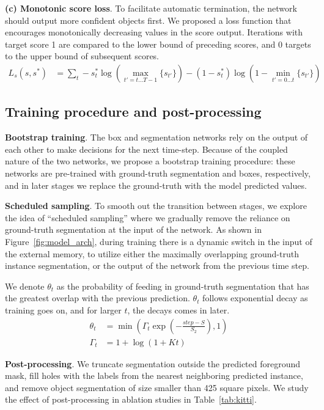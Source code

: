 \textbf{(c) Monotonic score loss}. To facilitate automatic termination, the
network should output more confident objects first. We proposed a loss function
that encourages monotonically decreasing values in the score output. Iterations
with target score 1 are compared to the lower bound of preceding scores, and 0
targets to the upper bound of subsequent scores.
\vspace{-3pt}
\begin{align}
L_s(s, s^*) &= \sum_t -s^*_t 
\log\left(\max_{t'=t...T-1} \{s_{t'}\}\right) - (1 - s^*_t)
\log\left(1 - \min_{t'=0...t} \{s_{t'}\}\right)
\end{align}

\subsection{Training procedure and post-processing}
\vspace{-3pt}

\textbf{Bootstrap training}. The box and segmentation networks rely on the
output of each other to make decisions for the next time-step. Because of the
coupled nature of the two networks, we propose a bootstrap training procedure:
these networks are pre-trained with ground-truth segmentation and boxes, 
respectively, and in later stages we replace the ground-truth with the model 
predicted values.

\textbf{Scheduled sampling}. To smooth out the transition between stages, we
explore the idea of ``scheduled sampling'' \cite{bengio15schedsamp} where we
gradually remove the reliance on ground-truth segmentation at the input of the
network. As shown in Figure~\ref{fig:model_arch}, during training there
is a dynamic switch in the input of the external memory, to utilize either the
maximally overlapping ground-truth instance segmentation, or the 
output of the network from the previous time step.

We denote $\theta_t$ as the probability of feeding in ground-truth segmentation
that has the greatest overlap with the previous prediction. $\theta_t$ follows
exponential decay as training goes on, and for larger $t$, the decays comes in
later.
\vspace{-3pt}
\begin{align}
\theta_t &= 
\min \left(\Gamma_t \exp \left(-\frac{step - S}{S_2} \right), 1 \right) \\
\Gamma_t &= 1 + \log(1 + Kt)
\end{align}

\textbf{Post-processing}. We truncate segmentation outside the predicted
foreground mask, fill holes with the labels from the nearest neighboring
predicted instance, and remove object segmentation of size smaller than 425
square pixels. We study the effect of post-processing in ablation studies in
Table~\ref{tab:kitti}.
